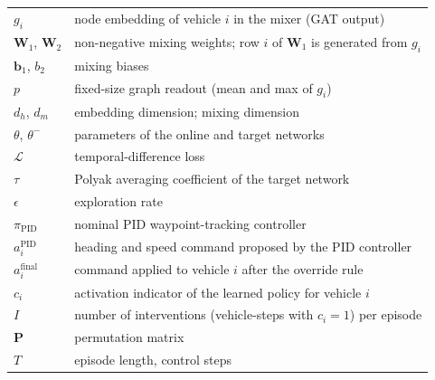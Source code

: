 {\begin{longtable*}{@{}l @{\quad=\quad} l@{}}
$g_i$                      & node embedding of vehicle $i$ in the mixer (GAT output) \\
$\mathbf{W}_1$, $\mathbf{W}_2$ & non-negative mixing weights; row $i$ of $\mathbf{W}_1$ is generated from $g_i$ \\
$\mathbf{b}_1$, $b_2$      & mixing biases \\
$p$                        & fixed-size graph readout (mean and max of $g_i$) \\
$d_h$, $d_m$               & embedding dimension; mixing dimension \\
$\theta$, $\theta^-$       & parameters of the online and target networks \\
$\mathcal{L}$              & temporal-difference loss \\
$\tau$                     & Polyak averaging coefficient of the target network \\
$\epsilon$                 & exploration rate \\
$\pi_{\text{PID}}$         & nominal PID waypoint-tracking controller \\
$a_i^{\text{PID}}$         & heading and speed command proposed by the PID controller \\
$a_i^{\text{final}}$       & command applied to vehicle $i$ after the override rule \\
$c_i$                      & activation indicator of the learned policy for vehicle $i$ \\
$I$                        & number of interventions (vehicle-steps with $c_i=1$) per episode \\
$\mathbf{P}$               & permutation matrix \\
$T$                        & episode length, control steps
\end{longtable*}}

